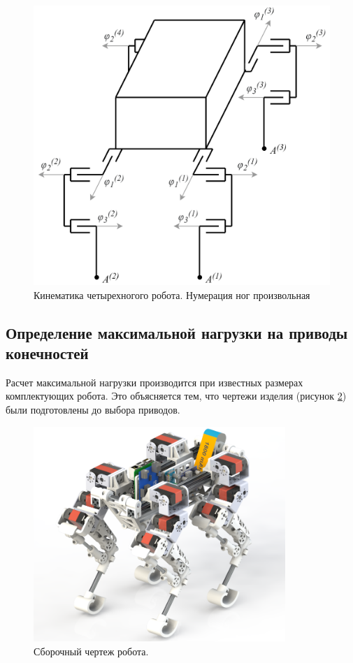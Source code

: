 \begin{figure}[ht]
    \centering
    \includegraphics[scale=1.16]{chapter_legged_robots/figure1.png}
    \caption{Кинематика четырехногого робота. Нумерация ног произвольная}
    \label{fig:kin_scheme1}
\end{figure}


\subsection{Определение максимальной нагрузки на приводы конечностей}

Расчет максимальной нагрузки производится при известных размерах комплектующих робота. Это объясняется тем, что чертежи изделия (рисунок \ref{fig:final_render}) были подготовлены до выбора приводов.

\begin{figure}[h]
    \centering
    \includegraphics[width=0.85\textwidth]{chapter_mechanics_construction/figure20.png}
    \caption{Сборочный чертеж робота.}
    \label{fig:final_render}
\end{figure}

